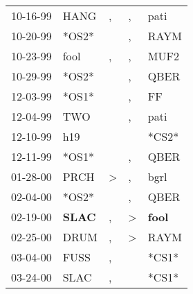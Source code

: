 \begin{supertabular}{p{0.07\textwidth}p{0.06\textwidth}p{0.02\textwidth}p{0.02\textwidth}p{0.06\textwidth}}
          10-16-99\textsuperscript{} &           HANG\textsuperscript{} &                , &                , &           pati\textsuperscript{} \\
          10-20-99\textsuperscript{} &                            *OS2* &                  &                , &           RAYM\textsuperscript{} \\
          10-23-99\textsuperscript{} &           fool\textsuperscript{} &                , &                , &           MUF2\textsuperscript{} \\
          10-29-99\textsuperscript{} &                            *OS2* &                  &                , &           QBER\textsuperscript{} \\
          12-03-99\textsuperscript{} &                            *OS1* &                  &                , &             FF\textsuperscript{} \\
          12-04-99\textsuperscript{} &            TWO\textsuperscript{} &                  &                , &           pati\textsuperscript{} \\
          12-10-99\textsuperscript{} &            h19\textsuperscript{} &                  &                  &                            *CS2* \\
          12-11-99\textsuperscript{} &                            *OS1* &                  &                , &           QBER\textsuperscript{} \\
          01-28-00\textsuperscript{} &           PRCH\textsuperscript{} &     \textgreater &                , &           bgrl\textsuperscript{} \\
          02-04-00\textsuperscript{} &                            *OS2* &                  &                , &           QBER\textsuperscript{} \\
          02-19-00\textsuperscript{} &  \textbf{SLAC\textsuperscript{}} &                , &     \textgreater &  \textbf{fool\textsuperscript{}} \\
          02-25-00\textsuperscript{} &           DRUM\textsuperscript{} &                , &     \textgreater &           RAYM\textsuperscript{} \\
          03-04-00\textsuperscript{} &           FUSS\textsuperscript{} &                , &                  &                            *CS1* \\
          03-24-00\textsuperscript{} &           SLAC\textsuperscript{} &                , &                  &                            *CS1* \\

\end{supertabular}
